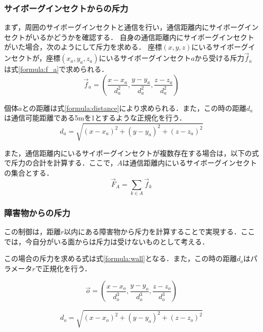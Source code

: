 \documentclass[a4paper,11pt]{jarticle}
\begin{document}
	\subsubsection{サイボーグインセクトからの斥力}
	\label{sec:repulsive_insect}
	まず，周囲のサイボーグインセクトと通信を行い，通信距離内にサイボーグインセクトがいるかどうかを確認する．
	自身の通信距離内にサイボーグインセクトがいた場合，次のようにして斥力を求める．
	座標$(x,y,z)$にいるサイボーグインセクトが，座標$(x_a,y_a,z_a)$にいるサイボーグインセクト$a$から受ける斥力$\vec{f}_a$は式\ref{formula:f_a}で求められる．
	\begin{equation}
	\label{formula:f_a}
	\vec{f}_a = (\frac{x - x_a}{d_a^2},\frac{y- y_a}{d_a^2},\frac{z - z_a}{d_a^2})
	\end{equation}
	
	個体$a$との距離は式\ref{formula:distance}により求められる．また，この時の距離$d_a$は通信可能距離である5mを1とするような正規化を行う．
	\begin{equation}
	\label{formula:distance}
	d_a = \sqrt{(x-x_a)^2+(y-y_a)^2+(z-z_a)^2}
	\end{equation}
	
	また，通信距離内にいるサイボーグインセクトが複数存在する場合は，以下の式で斥力の合計を計算する．ここで，$A$は通信距離内にいるサイボーグインセクトの集合とする．
	\begin{equation}
	\vec{F}_A =　\sum_{k \in A}\vec{f}_k
	\label{formula:repalsive}
	\end{equation}
	
	\subsubsection{障害物からの斥力}
	\label{sec:repulsive_object}
	この制御は，距離$r$以内にある障害物から斥力を計算することで実現する．ここでは，今自分がいる面からは斥力は受けないものとして考える．
	
	この場合の斥力を求める式は式\ref{formula:wall}となる．また，この時の距離$d_o$はパラメータ$r$で正規化を行う．
	
	\begin{equation}
	\vec{o} =  (\frac{x - x_o}{d_o^3},\frac{y- y_o}{d_o^3},\frac{z - z_o}{d_o^3})
	\label{formula:wall}
	\end{equation}
	
	\begin{equation}
	\label{formula:distance_object}
	d_o = \sqrt{(x-x_o)^2+(y-y_o)^2+(z-z_o)^2}	
	\end{equation}
	
\end{document}
